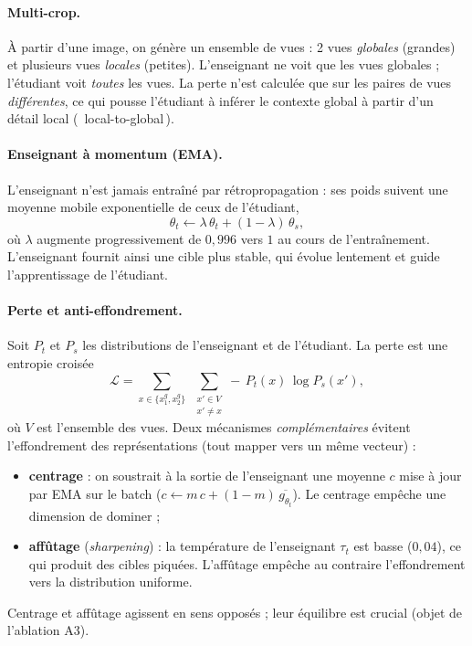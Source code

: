 \documentclass[11pt,a4paper]{article}
\begin{document}
\paragraph{Multi-crop.} À partir d'une image, on génère un ensemble de vues : 2 vues
\emph{globales} (grandes) et plusieurs vues \emph{locales} (petites). L'enseignant ne voit que les
vues globales ; l'étudiant voit \emph{toutes} les vues. La perte n'est calculée que sur les paires
de vues \emph{différentes}, ce qui pousse l'étudiant à inférer le contexte global à partir d'un
détail local (\guillemotleft\ local-to-global\,\guillemotright{}).

\paragraph{Enseignant à momentum (EMA).} L'enseignant n'est jamais entraîné par
rétropropagation : ses poids suivent une moyenne mobile exponentielle de ceux de l'étudiant,
\begin{equation}
  \theta_t \leftarrow \lambda\,\theta_t + (1-\lambda)\,\theta_s,
\end{equation}
où $\lambda$ augmente progressivement de $0{,}996$ vers $1$ au cours de l'entraînement. L'enseignant
fournit ainsi une cible plus stable, qui évolue lentement et guide l'apprentissage de l'étudiant.

\paragraph{Perte et anti-effondrement.} Soit $P_t$ et $P_s$ les distributions de l'enseignant et
de l'étudiant. La perte est une entropie croisée
\begin{equation}
  \mathcal{L} = \sum_{x \in \{x_1^g, x_2^g\}} \;\sum_{\substack{x' \in V \\ x' \neq x}}
  -\,P_t(x)\,\log P_s(x'),
\end{equation}
où $V$ est l'ensemble des vues. Deux mécanismes \emph{complémentaires} évitent l'effondrement des
représentations (tout mapper vers un même vecteur) :
\begin{itemize}[nosep]
  \item \textbf{centrage} : on soustrait à la sortie de l'enseignant une moyenne $c$ mise à jour
  par EMA sur le batch ($c \leftarrow m\,c + (1-m)\,\overline{g_{\theta_t}}$). Le centrage
  empêche une dimension de dominer ;
  \item \textbf{affûtage} (\emph{sharpening}) : la température de l'enseignant $\tau_t$ est basse
  ($0{,}04$), ce qui produit des cibles piquées. L'affûtage empêche au contraire l'effondrement
  vers la distribution uniforme.
\end{itemize}
Centrage et affûtage agissent en sens opposés ; leur équilibre est crucial (objet de l'ablation
A3).
\end{document}
